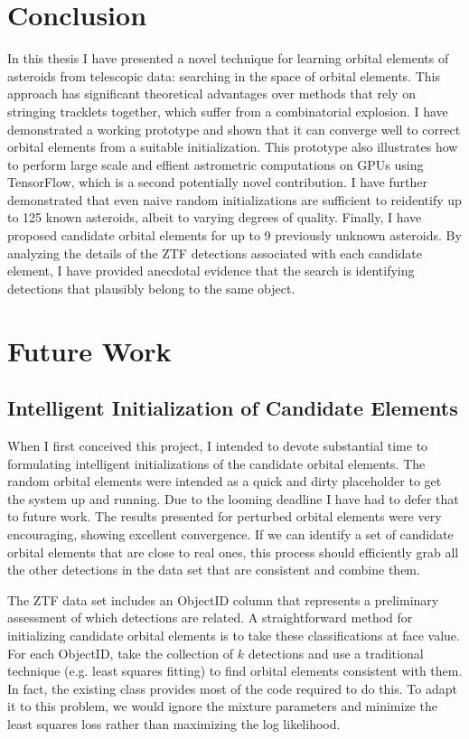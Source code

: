 \section{Conclusion}
\label{search_conclusion}
In this thesis I have presented a novel technique for learning orbital elements of asteroids from telescopic data: searching in the space of orbital elements.
This approach has significant theoretical advantages over methods that rely on stringing tracklets together, which suffer from a combinatorial explosion.
I have demonstrated a working prototype and shown that it can converge well to correct orbital elements from a suitable initialization.
This prototype also illustrates how to perform large scale and effient astrometric computations on GPUs using TensorFlow,
which is a second potentially novel contribution.
I have further demonstrated that even naive random initializations are sufficient to reidentify up to 125 known asteroids, albeit to varying degrees of quality.
Finally, I have proposed candidate orbital elements for up to 9 previously unknown asteroids.
By analyzing the details of the ZTF detections associated with each candidate element,
I have provided anecdotal evidence that the search is identifying detections that plausibly belong to the same object.

\section{Future Work}
\label{section_future_work}

\subsection{Intelligent Initialization of Candidate Elements}
\label{subsection_intelligent_initialization}
When I first conceived this project, I intended to devote substantial time to formulating intelligent initializations of the candidate orbital elements.
The random orbital elements were intended as a quick and dirty placeholder to get the system up and running.
Due to the looming deadline I have had to defer that to future work.
The results presented for perturbed orbital elements were very encouraging, showing excellent convergence.
If we can identify a set of candidate orbital elements that are close to real ones, this process should efficiently grab
all the other detections in the data set that are consistent and combine them.

The ZTF data set includes an ObjectID column that represents a preliminary assessment of which detections are related.
A straightforward method for initializing candidate orbital elements is to take these classifications at face value.
For each ObjectID, take the collection of $k$ detections and use a traditional technique (e.g. least squares fitting) to find orbital elements consistent with them.
In fact, the existing  class provides most of the code required to do this.
To adapt it to this problem, we would ignore the mixture parameters and minimize the least squares loss rather than maximizing the log likelihood.

